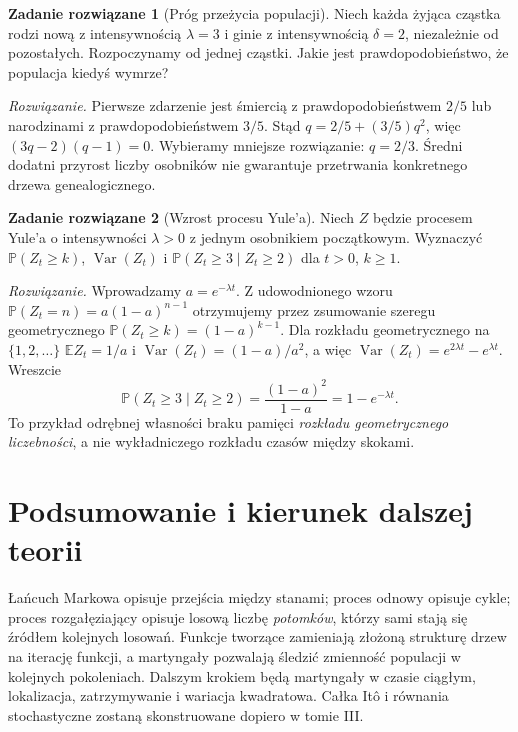 \documentclass[11pt,a4paper,oneside]{report}
\numberwithin{equation}{chapter}
\theoremstyle{plain}
\theoremstyle{definition}
\newtheorem{zadanie}{Zadanie rozwiązane}[chapter]
\theoremstyle{remark}
\newcommand{\Prob}{\mathbb{P}}
\newcommand{\E}{\mathbb{E}}
\newcommand{\Var}{\operatorname{Var}}
\begin{document}
\begin{zadanie}[Próg przeżycia populacji]
Niech każda żyjąca cząstka rodzi nową z intensywnością
$\lambda=3$ i ginie z intensywnością $\delta=2$,
niezależnie od pozostałych. Rozpoczynamy od jednej cząstki.
Jakie jest prawdopodobieństwo, że populacja kiedyś wymrze?

\emph{Rozwiązanie.} Pierwsze zdarzenie jest śmiercią
z prawdopodobieństwem $2/5$ lub narodzinami z prawdopodobieństwem
$3/5$. Stąd $q=2/5+(3/5)q^2$, więc
$(3q-2)(q-1)=0$.
Wybieramy mniejsze rozwiązanie: $q=2/3$.
Średni dodatni przyrost liczby osobników nie gwarantuje
przetrwania konkretnego drzewa genealogicznego.
\end{zadanie}


\begin{zadanie}[Wzrost procesu Yule'a]
Niech $Z$ będzie procesem Yule'a o intensywności $\lambda>0$
z jednym osobnikiem początkowym. Wyznaczyć
$\Prob(Z_t\ge k)$, $\Var(Z_t)$ i
$\Prob(Z_t\ge3\mid Z_t\ge2)$ dla $t>0$, $k\ge1$.

\emph{Rozwiązanie.} Wprowadzamy $a=e^{-\lambda t}$.
Z udowodnionego wzoru $\Prob(Z_t=n)=a(1-a)^{n-1}$
otrzymujemy przez zsumowanie szeregu geometrycznego
$\Prob(Z_t\ge k)=(1-a)^{k-1}$.
Dla rozkładu geometrycznego na $\{1,2,\dots\}$
$\E Z_t=1/a$ i $\Var(Z_t)=(1-a)/a^2$, a więc
$\Var(Z_t)=e^{2\lambda t}-e^{\lambda t}$.
Wreszcie
\[
\Prob(Z_t\ge3\mid Z_t\ge2)
=\frac{(1-a)^2}{1-a}=1-e^{-\lambda t}.
\]
To przykład odrębnej własności braku pamięci
\emph{rozkładu geometrycznego liczebności},
a nie wykładniczego rozkładu czasów między skokami.
\end{zadanie}

\section{Podsumowanie i kierunek dalszej teorii}
Łańcuch Markowa opisuje przejścia między stanami;
proces odnowy opisuje cykle; proces rozgałęziający
opisuje losową liczbę \emph{potomków}, którzy sami
stają się źródłem kolejnych losowań. Funkcje tworzące
zamieniają złożoną strukturę drzew na iterację funkcji,
a martyngały pozwalają śledzić zmienność populacji
w kolejnych pokoleniach. Dalszym krokiem będą martyngały w czasie ciągłym, lokalizacja,
zatrzymywanie i wariacja kwadratowa. Całka Itô i równania
stochastyczne zostaną skonstruowane dopiero w tomie III.


\end{document}
